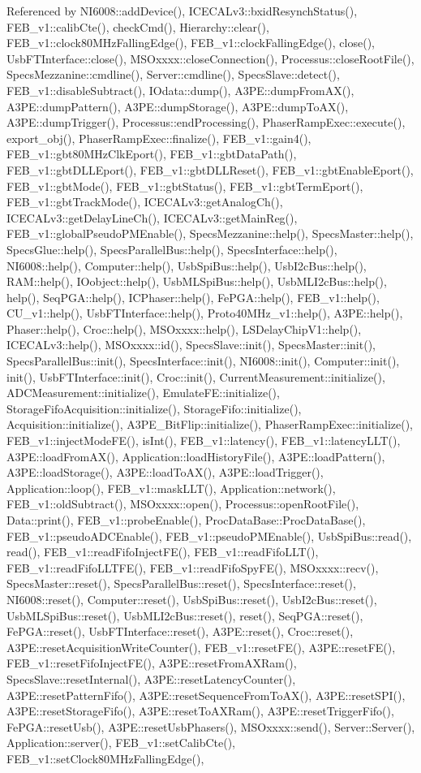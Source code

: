 Referenced by NI6008::addDevice(), ICECALv3::bxidResynchStatus(), FEB\_\-v1::calibCte(), checkCmd(), Hierarchy::clear(), FEB\_\-v1::clock80MHzFallingEdge(), FEB\_\-v1::clockFallingEdge(), close(), UsbFTInterface::close(), MSOxxxx::closeConnection(), Processus::closeRootFile(), SpecsMezzanine::cmdline(), Server::cmdline(), SpecsSlave::detect(), FEB\_\-v1::disableSubtract(), IOdata::dump(), A3PE::dumpFromAX(), A3PE::dumpPattern(), A3PE::dumpStorage(), A3PE::dumpToAX(), A3PE::dumpTrigger(), Processus::endProcessing(), PhaserRampExec::execute(), export\_\-obj(), PhaserRampExec::finalize(), FEB\_\-v1::gain4(), FEB\_\-v1::gbt80MHzClkEport(), FEB\_\-v1::gbtDataPath(), FEB\_\-v1::gbtDLLEport(), FEB\_\-v1::gbtDLLReset(), FEB\_\-v1::gbtEnableEport(), FEB\_\-v1::gbtMode(), FEB\_\-v1::gbtStatus(), FEB\_\-v1::gbtTermEport(), FEB\_\-v1::gbtTrackMode(), ICECALv3::getAnalogCh(), ICECALv3::getDelayLineCh(), ICECALv3::getMainReg(), FEB\_\-v1::globalPseudoPMEnable(), SpecsMezzanine::help(), SpecsMaster::help(), SpecsGlue::help(), SpecsParallelBus::help(), SpecsInterface::help(), NI6008::help(), Computer::help(), UsbSpiBus::help(), UsbI2cBus::help(), RAM::help(), IOobject::help(), UsbMLSpiBus::help(), UsbMLI2cBus::help(), help(), SeqPGA::help(), ICPhaser::help(), FePGA::help(), FEB\_\-v1::help(), CU\_\-v1::help(), UsbFTInterface::help(), Proto40MHz\_\-v1::help(), A3PE::help(), Phaser::help(), Croc::help(), MSOxxxx::help(), LSDelayChipV1::help(), ICECALv3::help(), MSOxxxx::id(), SpecsSlave::init(), SpecsMaster::init(), SpecsParallelBus::init(), SpecsInterface::init(), NI6008::init(), Computer::init(), init(), UsbFTInterface::init(), Croc::init(), CurrentMeasurement::initialize(), ADCMeasurement::initialize(), EmulateFE::initialize(), StorageFifoAcquisition::initialize(), StorageFifo::initialize(), Acquisition::initialize(), A3PE\_\-BitFlip::initialize(), PhaserRampExec::initialize(), FEB\_\-v1::injectModeFE(), isInt(), FEB\_\-v1::latency(), FEB\_\-v1::latencyLLT(), A3PE::loadFromAX(), Application::loadHistoryFile(), A3PE::loadPattern(), A3PE::loadStorage(), A3PE::loadToAX(), A3PE::loadTrigger(), Application::loop(), FEB\_\-v1::maskLLT(), Application::network(), FEB\_\-v1::oldSubtract(), MSOxxxx::open(), Processus::openRootFile(), Data::print(), FEB\_\-v1::probeEnable(), ProcDataBase::ProcDataBase(), FEB\_\-v1::pseudoADCEnable(), FEB\_\-v1::pseudoPMEnable(), UsbSpiBus::read(), read(), FEB\_\-v1::readFifoInjectFE(), FEB\_\-v1::readFifoLLT(), FEB\_\-v1::readFifoLLTFE(), FEB\_\-v1::readFifoSpyFE(), MSOxxxx::recv(), SpecsMaster::reset(), SpecsParallelBus::reset(), SpecsInterface::reset(), NI6008::reset(), Computer::reset(), UsbSpiBus::reset(), UsbI2cBus::reset(), UsbMLSpiBus::reset(), UsbMLI2cBus::reset(), reset(), SeqPGA::reset(), FePGA::reset(), UsbFTInterface::reset(), A3PE::reset(), Croc::reset(), A3PE::resetAcquisitionWriteCounter(), FEB\_\-v1::resetFE(), A3PE::resetFE(), FEB\_\-v1::resetFifoInjectFE(), A3PE::resetFromAXRam(), SpecsSlave::resetInternal(), A3PE::resetLatencyCounter(), A3PE::resetPatternFifo(), A3PE::resetSequenceFromToAX(), A3PE::resetSPI(), A3PE::resetStorageFifo(), A3PE::resetToAXRam(), A3PE::resetTriggerFifo(), FePGA::resetUsb(), A3PE::resetUsbPhasers(), MSOxxxx::send(), Server::Server(), Application::server(), FEB\_\-v1::setCalibCte(), FEB\_\-v1::setClock80MHzFallingEdge(), 